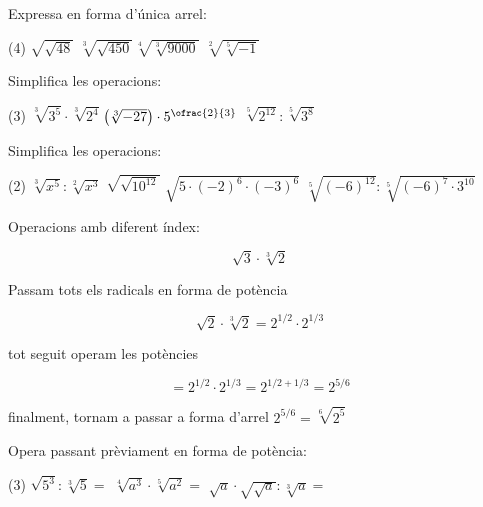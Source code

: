 \begin{mylist}
 \exer Expressa en forma d'única arrel:  
 \begin{tasks}(4)
 	\task  \textbf{$\sqrt{\sqrt{48} } $}   \task  \textbf{$\sqrt[{3}]{\sqrt{450} } $}${}^{  }$\task  \textbf{$\sqrt[{4}]{\sqrt[{3}]{9000} } $}  ${}^{ }$\task  \textbf{$\sqrt[{2}]{\sqrt[{5}]{-1} } $} 
 \end{tasks}
\answers[cols=2]{[$\sqrt[4]{48}$, $\sqrt[6]{450}$, $\sqrt[12]{9000}$, $\sqrt[10]{-1}=\nexists$]}
 
 \exer  Simplifica les operacions:  
 \begin{tasks}(3)
 	\task  $\sqrt[{3}]{3^{5} } \cdot \sqrt[{3}]{2^{4} } $${}^{ }$${}^{ }$\task  $\left(\sqrt[{3}]{-27} \right)\cdot 5^{\ofrac{2}{3} } $  \task  $\sqrt[{5}]{2^{12} } :\sqrt[{5}]{3^{8} } $  
 \end{tasks}
 
 \vspace{2cm}
 
 \exer  Simplifica les operacions:  
 \begin{tasks}(2)
 	\task  $\sqrt[{3}]{x^{5} } :\sqrt[{2}]{x^{3} } $   \task  $\sqrt{\sqrt{10^{12} } } $   \task  $\sqrt{5\cdot (-2)^{6} \cdot (-3)^{6} } $ \task  $\sqrt[{5}]{(-6)^{12} } :\sqrt[{5}]{(-6)^{7} \cdot 3^{10} } $ 
 \end{tasks}
\end{mylist}

\begin{resolt}[E]{
	Operacions amb diferent índex:
	
	\[   \sqrt{3} \cdot \sqrt[3]{2}  \]
}
 Passam tots els radicals en forma de potència

\[ \sqrt{2} \cdot \sqrt[3]{2}= 2^{1/2} \cdot 2^{1/3} \]

tot seguit operam les potències

\[ =2^{1/2} \cdot 2^{1/3} = 2^{1/2+1/3} = 2^{5/6} \]

finalment, tornam a passar a forma d'arrel
$ 2^{5/6} = \sqrt[6]{2^5} $
\end{resolt}

\begin{mylist}
	\exer Opera passant prèviament en forma de potència:
	\begin{tasks}(3)
		\task $\sqrt{5^3} : \sqrt[3]{5}=$
		\task $\sqrt[4]{a^3} \cdot \sqrt[5]{a^2}=$
		\task $\sqrt{a} \cdot \sqrt{\sqrt{a}} : \sqrt[3]{a}=$ 
	\end{tasks}
\end{mylist}

